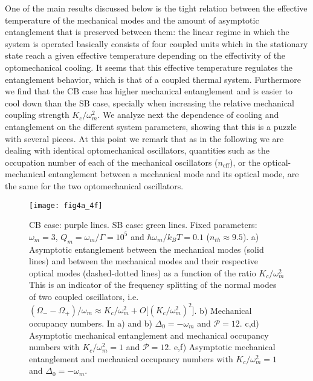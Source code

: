 \documentclass[a4paper]{jpconf}
\begin{document}
One of the main results discussed below is the tight relation between the effective temperature of the mechanical modes and the amount of
asymptotic entanglement that is preserved between them: the linear regime
in which the system is operated basically consists of four coupled units which in the stationary state reach
a given effective temperature depending on the effectivity of the optomechanical cooling. It seems that this 
effective temperature regulates the entanglement behavior, which is that of a coupled thermal system.
Furthermore we find that the CB case has higher mechanical entanglement and is easier to cool down than 
the SB case, specially when increasing the relative mechanical coupling strength $K_c/\omega_m^2$.
We analyze next the dependence of cooling and entanglement on the different system parameters, showing
that this is a puzzle with several pieces.  At this point we remark that as in the following we are dealing with identical optomechanical oscillators,
quantities such as the occupation number of each of the mechanical oscillators ($n_{\mathrm{eff}}$), or the optical-mechanical entanglement between a mechanical mode
and its optical mode, are the same for the two optomechanical oscillators.

\begin{figure}[b!]
 \centering
 \texttt{[image: fig4a\_4f]}
 \caption{\label{figurefour} CB case: purple lines. SB case: green lines. Fixed 
parameters: $\omega_m=3$, $Q_m=\omega_m/\Gamma=10^5$ and $\hbar\omega_m/k_BT=0.1$ 
($n_{th}\approx9.5$). a) Asymptotic entanglement between the mechanical modes 
(solid lines) and between the mechanical modes and their respective optical 
modes (dashed-dotted lines)  as a function of the ratio $K_c/\omega_m^2$ 
This is an indicator of the 
frequency splitting of the normal modes of two coupled oscillators, i.e. 
$(\Omega_--\Omega_+)/\omega_m\approx K_c/\omega_m^2+O\big[(K_c/\omega_m^2)^2\big]$. 
b) Mechanical occupancy numbers. In a) and b) 
$\Delta_0=-\omega_m$ and $\mathcal{P}=12$. c,d) Asymptotic mechanical 
entanglement and mechanical occupancy numbers with $K_c/\omega_m^2=1$ and 
$\mathcal{P}=12$. e,f) Asymptotic mechanical entanglement and mechanical 
occupancy numbers with $K_c/\omega_m^2=1$ and $\Delta_0=-\omega_m$. }
\end{figure}
\end{document}
